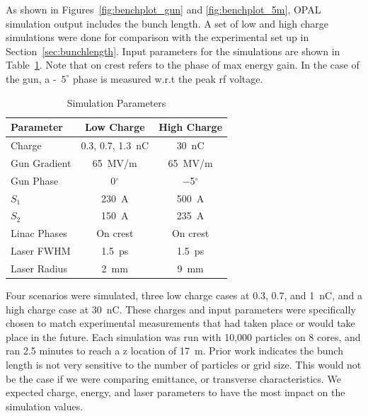 As shown in Figures~\ref{fig:benchplot_gun} and \ref{fig:benchplot_5m}, 
OPAL simulation output includes the bunch length.
A set of low and high charge simulations were done  
for comparison with the experimental set up in Section~\ref{sec:bunchlength}.
Input parameters for the simulations are shown in Table~\ref{simparam}.
Note that on crest refers to the phase of max energy gain.
In the case of the gun, a -~$5^{\circ}$ phase is measured 
w.r.t the peak rf voltage.
\begin{table}[hbt]
	\centering
	\caption{Simulation Parameters}
	\begin{tabular}{lcc}
		\toprule
		\toprule
		\textbf{Parameter} & \textbf{Low Charge}  & \textbf{High Charge} \\
		\midrule
		Charge       & 0.3, 0.7, \SI{1.3}{nC}        & \SI{30}{nC}    \\ %
		Gun Gradient & \SI{65}{MV/m}     & \SI{65}{MV/m}  \\ %
		Gun Phase    & \SI{0}{}$^{\circ}$ & \SI{-5}{}$^{\circ}$ \\		 
		$S_1$        & \SI{230}{A}		 & \SI{500}{A}	  \\
		$S_2$		 & \SI{150}{A}   	 & \SI{235}{A}		 \\
		Linac Phases & On crest          & On crest       \\
		Laser FWHM   & \SI{1.5}{ps}      & \SI{1.5}{ps}   \\ %
		Laser Radius & \SI{2}{mm}        & \SI{9}{mm}     \\
		\bottomrule
	\end{tabular}
	\label{simparam}
\end{table}

Four scenarios were simulated, three low charge cases at 0.3, 0.7, and \SI{1}{nC}, and a 
high charge case at \SI{30}{nC}. 
These charges and input parameters were specifically chosen to 
match experimental measurements that had taken place or would 
take place in the future. Each simulation was run with 10,000 particles 
on 8 cores, and ran 2.5 minutes to reach a z location of \SI{17}{m}.
Prior work \cite{benchmark} indicates the bunch length is not 
very sensitive to the number of particles or grid size. 
This would not be the case if we were comparing emittance, or 
transverse characteristics. We expected charge, energy,
and laser parameters to have the most impact on the simulation values.


